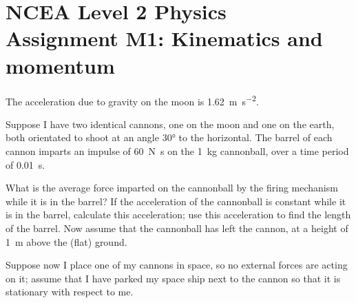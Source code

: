 \documentclass[answers]{exam}
\begin{document}
\section*{NCEA Level 2 Physics\\Assignment M1: Kinematics and momentum}

The acceleration due to gravity on the moon is \SI{1.62}{\metre\per\second\squared}.

Suppose I have two identical cannons, one on the moon and one on the earth, both orientated to shoot at an angle \ang{30}
to the horizontal. The barrel of each cannon imparts an impulse of \SI{60}{\newton\second}
on the \SI{1}{\kilo\gram} cannonball, over a time period of \SI{0.01}{\second}.

\begin{questions}
  \question What is the average force imparted on the cannonball by the firing mechanism while it is in the barrel?
  \question If the acceleration of the cannonball is constant while it is in the barrel,
            calculate this acceleration; use this acceleration to find the length of the barrel.
  \question Now assume that the cannonball has left the cannon, at a height of \SI{1}{\metre}
            above the (flat) ground.
  \question Suppose now I place one of my cannons in space, so no external forces are acting on it; assume
            that I have parked my space ship next to the cannon so that it is stationary with respect to me.


\end{questions}
\end{document}
